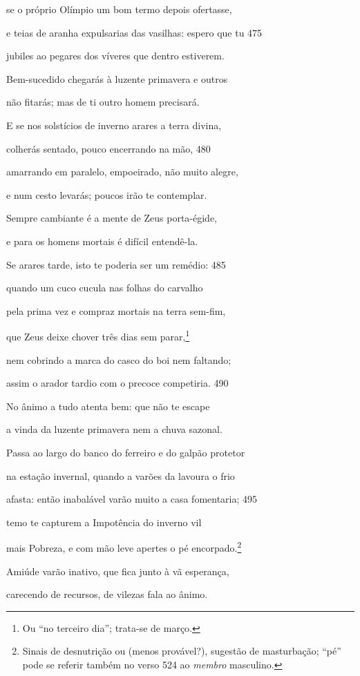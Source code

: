 se o próprio Olímpio um bom termo depois ofertasse,

e teias de aranha expulsarias das vasilhas: espero que tu \num{475}

jubiles ao pegares dos víveres que dentro estiverem.

Bem-sucedido chegarás à luzente primavera e outros

não fitarás; mas de ti outro homem precisará.

E se nos solstícios de inverno arares a terra divina,

colherás sentado, pouco encerrando na mão, \num{480}

amarrando em paralelo, empoeirado, não muito alegre,

e num cesto levarás; poucos irão te contemplar.

Sempre cambiante é a mente de Zeus porta-égide,

e para os homens mortais é difícil entendê-la.

Se arares tarde, isto te poderia ser um remédio: \num{485}

quando um cuco cucula nas folhas do carvalho

pela prima vez e compraz mortais na terra sem-fim,

que Zeus deixe chover três dias sem parar,\footnote{Ou ``no terceiro dia''; trata-se de março.}

nem cobrindo a marca do casco do boi nem faltando;

assim o arador tardio com o precoce competiria. \num{490}

No ânimo a tudo atenta bem: que não te escape

a vinda da luzente primavera nem a chuva sazonal.

Passa ao largo do banco do ferreiro e do galpão protetor

na estação invernal, quando a varões da lavoura o frio

afasta: então inabalável varão muito a casa fomentaria; \num{495}

temo te capturem a Impotência do inverno vil

mais Pobreza, e com mão leve apertes o pé encorpado.\footnote{Sinais de desnutrição ou (menos provável?), sugestão de masturbação; ``pé'' pode se referir também no verso 524 ao \emph{membro}
masculino.}

Amiúde varão inativo, que fica junto à vã esperança,

carecendo de recursos, de vilezas fala ao ânimo.

